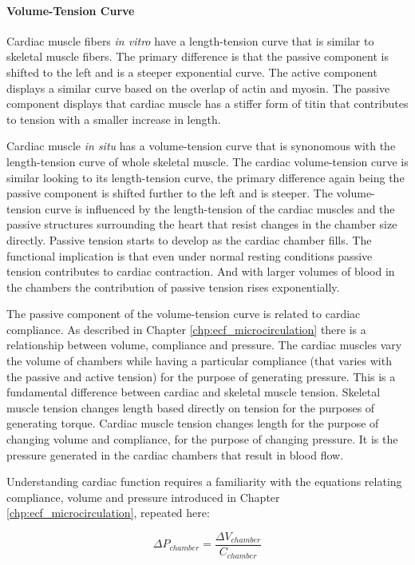\paragraph{Volume-Tension Curve}

Cardiac muscle fibers \textit{in vitro} have a length-tension curve that is similar to skeletal muscle fibers. The primary difference is that the passive component is shifted to the left and is a steeper exponential curve. The active component displays a similar curve based on the overlap of actin and myosin. The passive component displays that cardiac muscle has a stiffer form of titin that contributes to tension with a smaller increase in length. 

Cardiac muscle \textit{in situ} has a volume-tension curve that is synonomous with the length-tension curve of whole skeletal muscle. The cardiac volume-tension curve is similar looking to its length-tension curve, the primary difference again being the passive component is shifted further to the left and is steeper. The volume-tension curve is influenced by the length-tension of the cardiac muscles and the passive structures surrounding the heart that resist changes in the chamber size directly. Passive tension starts to develop as the cardiac chamber fills. The functional implication is that even under normal resting conditions passive tension contributes to cardiac contraction. And with larger volumes of blood in the chambers the contribution of passive tension rises exponentially.

The passive component of the volume-tension curve is related to cardiac compliance. As described in Chapter \ref{chp:ecf_microcirculation} there is a relationship between volume, compliance and pressure. The cardiac muscles vary the volume of chambers while having a particular compliance (that varies with the passive and active tension) for the purpose of generating pressure. This is a fundamental difference between cardiac and skeletal muscle tension. Skeletal muscle tension changes length based directly on tension for the purposes of generating torque. Cardiac muscle tension changes length for the purpose of changing volume and compliance, for the purpose of changing pressure. It is the pressure generated in the cardiac chambers that result in blood flow.

Understanding cardiac function requires a familiarity with the equations relating compliance, volume and pressure introduced in Chapter \ref{chp:ecf_microcirculation}, repeated here:

\begin{equation}
    \Delta P_{chamber} = \frac{\Delta V_{chamber}}{C_{chamber}}
    \label{Cardiac_Pressure}
\end{equation}

